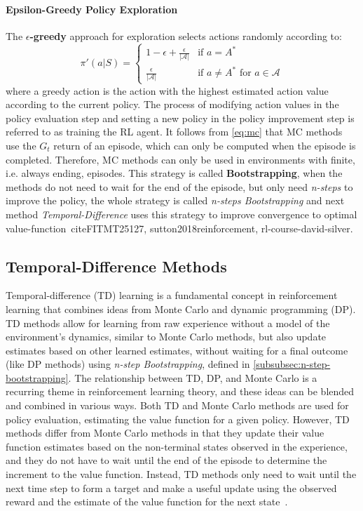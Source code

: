 \documentclass[../xlapes02]{subfiles}
\begin{document}
    \paragraph{Epsilon-Greedy Policy Exploration}
    The \textbf{$\epsilon$-greedy} approach for exploration selects actions randomly according to:
    \begin{equation}
        \pi'(a | S) =
        \begin{cases}
            1 - \epsilon + \frac{\epsilon}{|\mathcal{A}|} & \text{if } a = A^* \\
            \frac{\epsilon}{|\mathcal{A}|} & \text{if } a \neq A^* \text{ for } a \in \mathcal{A}
        \end{cases}
    \end{equation}
    where a greedy action is the action with the highest estimated action value according to the current policy. The process of modifying action values in the policy evaluation step and setting a new policy in the policy improvement step is referred to as training the RL agent. It follows from \cref{eq:mc} that MC methods use the $G_t$ return of an episode, which can only be computed when the episode is completed. Therefore, MC methods can only be used in environments with finite, i.e. always ending, episodes. This strategy is called \textbf{Bootstrapping}, when the methods do not need to wait for the end of the episode, but only need \emph{n-steps} to improve the policy, the whole strategy is called \emph{n-steps Bootstrapping} and next method \emph{Temporal-Difference} uses this strategy to improve convergence to optimal value-function~cite{FITMT25127, sutton2018reinforcement, rl-course-david-silver}.

    \subsection{Temporal-Difference Methods}\label{subsec:temporal-difference-methods}

    Temporal-difference (TD) learning is a fundamental concept in reinforcement learning that combines ideas from Monte Carlo and dynamic programming (DP). TD methods allow for learning from raw experience without a model of the environment's dynamics, similar to Monte Carlo methods, but also update estimates based on other learned estimates, without waiting for a final outcome (like DP methods) using \emph{n-step Bootstrapping}, defined in \cref{subsubsec:n-step-bootstrapping}. The relationship between TD, DP, and Monte Carlo is a recurring theme in reinforcement learning theory, and these ideas can be blended and combined in various ways. Both TD and Monte Carlo methods are used for policy evaluation, estimating the value function for a given policy. However, TD methods differ from Monte Carlo methods in that they update their value function estimates based on the non-terminal states observed in the experience, and they do not have to wait until the end of the episode to determine the increment to the value function. Instead, TD methods only need to wait until the next time step to form a target and make a useful update using the observed reward and the estimate of the value function for the next state~\cite{rl-course-david-silver, sutton2018reinforcement}.
\end{document}
